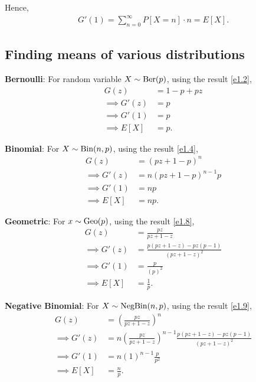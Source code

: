 Hence,
\begin{equation}
    \begin{aligned}
        G'(1) = \sum_{n=0}^{\infty}P[X=n]\cdot n = E[X].
    \end{aligned}
    \label{e1.15}
\end{equation}

\subsection*{Finding means of various distributions}

\noindent\textbf{Bernoulli}: For random variable $X\sim \text{Ber}(p)$, using the
result \ref{e1.2},
\begin{equation}
    \begin{aligned}
        G(z) &= 1-p + pz \\
        \implies G'(z) &= p \\
        \implies G'(1) &= p \\
        \implies E[X] &= p.
    \end{aligned}
    \label{e1.16}
\end{equation}

\noindent\textbf{Binomial}: For $X\sim \text{Bin}(n, p)$, using the result \ref{e1.4},
\begin{equation}
    \begin{aligned}
        G(z) &= (pz + 1 - p)^n \\
        \implies G'(z) &= n(pz + 1 - p)^{n-1}p \\
        \implies G'(1) &= np \\
        \implies E[X] &= np.
    \end{aligned}
    \label{e1.17}
\end{equation}

\noindent\textbf{Geometric}: For $x\sim \text{Geo}(p)$, using the result \ref{e1.8},
\begin{equation}
    \begin{aligned}
        G(z) &= \frac{pz}{pz+1-z} \\
        \implies G'(z) &= \frac{p(pz+1-z) - pz(p-1)}{(pz+1-z)^2} \\
        \implies G'(1) &= \frac{p}{(p)^2} \\
        \implies E[X] &= \frac{1}{p}.
    \end{aligned}
    \label{e1.18}
\end{equation}

\noindent\textbf{Negative Binomial}: For $X\sim \text{NegBin}(n,p)$, using the result
\ref{e1.9},
\begin{equation}
    \begin{aligned}
        G(z) &= \left(\frac{pz}{pz+1-z}\right)^n \\
        \implies G'(z) &= n\left(\frac{pz}{pz+1-z}\right)^{n-1}\frac{p(pz+1-z) - 
        pz(p-1)}{(pz+1-z)^2} \\
        \implies G'(1) &= n(1)^{n-1}\frac{p}{p^2} \\
        \implies E[X] &= \frac{n}{p}.
    \end{aligned}
    \label{e1.19}
\end{equation}
